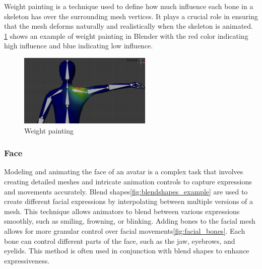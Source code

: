 \documentclass[../../main.tex]{subfiles}
\begin{document}
Weight painting is a technique used to define how much influence each bone in a skeleton has over the surrounding mesh vertices. It plays a crucial role in ensuring that the mesh deforms naturally and realistically when the skeleton is animated. \ref{fig:weight_painting} shows an example of weight painting in Blender with the red color indicating high influence and blue indicating low influence.

\begin{figure}
  \centering \includegraphics[width = 2.5in]{chapters/background_work/images/weight_painting.png}
  \caption{Weight painting}
  \label{fig:weight_painting}
\end{figure}

\subsubsection{Face}

Modeling and animating the face of an avatar is a complex task that involves creating detailed meshes and intricate animation controls to capture expressions and movements accurately. Blend shapes\ref{fig:blendshapes_example} are used to create different facial expressions by interpolating between multiple versions of a mesh. This technique allows animators to blend between various expressions smoothly, such as smiling, frowning, or blinking. Adding bones to the facial mesh allows for more granular control over facial movements\ref{fig:facial_bones}. Each bone can control different parts of the face, such as the jaw, eyebrows, and eyelids. This method is often used in conjunction with blend shapes to enhance expressiveness.
\end{document}
